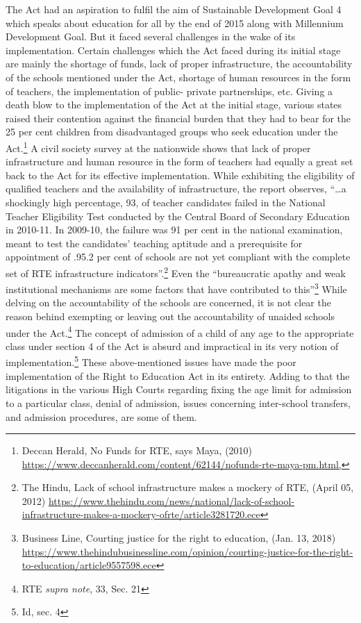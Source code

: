 \begin{multicols}{2}
\noi
The Act had an aspiration to fulfil the aim of Sustainable Development Goal 4 which speaks
about education for all by the end of 2015 along with Millennium Development Goal. But it
faced several challenges in the wake of its implementation. Certain challenges which the Act
faced during its initial stage are mainly the shortage of funds, lack of proper infrastructure,
the accountability of the schools mentioned under the Act, shortage of human resources in the
form of teachers, the implementation of public- private partnerships, etc. Giving a death blow
to the implementation of the Act at the initial stage, various states raised their contention
against the financial burden that they had to bear for the 25 per cent children from
disadvantaged groups who seek education under the Act.\footnote{Deccan Herald, No Funds for RTE, says Maya, (2010) \url{https://www.deccanherald.com/content/62144/nofunds-rte-maya-pm.html,}} A civil society survey at the
nationwide shows that lack of proper infrastructure and human resource in the form of
teachers had equally a great set back to the Act for its effective implementation. While
exhibiting the eligibility of qualified teachers and the availability of infrastructure, the report
observes, “…a shockingly high percentage, 93, of teacher candidates failed in the National 
Teacher Eligibility Test conducted by the Central Board of Secondary Education in 2010-11.
In 2009-10, the failure was 91 per cent in the national examination, meant to test the
candidates' teaching aptitude and a prerequisite for appointment of .95.2 per cent of schools
are not yet compliant with the complete set of RTE infrastructure indicators”.\footnote{The Hindu, Lack of school infrastructure makes a mockery of RTE, (April 05, 2012)   \url{https://www.thehindu.com/news/national/lack-of-school-infrastructure-makes-a-mockery-ofrte/article3281720.ece}} Even the “bureaucratic apathy and weak institutional mechanisms are some factors that have
contributed to this”\footnote{Business Line, Courting justice for the right to education, (Jan. 13, 2018)
 \url{https://www.thehindubusinessline.com/opinion/courting-justice-for-the-right-to-education/article9557598.ece}} While delving on the accountability of the schools are concerned, it is
not clear the reason behind exempting or leaving out the accountability of unaided schools
under the Act.\footnote{RTE \textit{supra note}, 33, Sec. 21} The concept of admission of a child of any age to the appropriate class under section 4 of the Act is absurd and impractical in its very notion of implementation.\footnote{ Id, sec. 4} These above-mentioned issues have made the poor implementation of the Right to Education Act in
its entirety. Adding to that the litigations in the various High Courts regarding fixing the age
limit for admission to a particular class, denial of admission, issues concerning inter-school
transfers, and admission procedures, are some of them.


\end{multicols}
